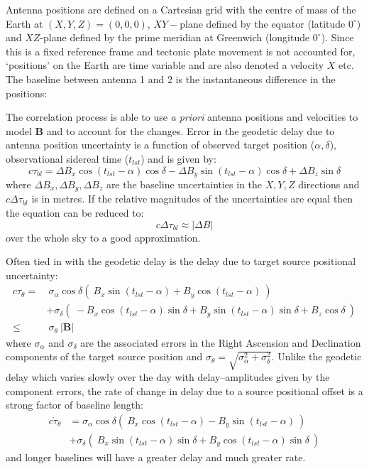 		Antenna positions are defined on a Cartesian grid with the centre of mass of the Earth at $(X,Y,Z)=(0,0,0)$, $XY-$plane defined by the equator (latitude $0^{\circ}$) and $XZ$-plane defined by the prime meridian at Greenwich (longitude $0^{\circ}$). Since this is a fixed reference frame and tectonic plate movement is not accounted for, `positions' on the Earth are time variable and are also denoted a velocity $\dot X$ etc. The baseline between antenna 1 and 2 is the instantaneous difference in the positions: %
		
		The correlation process is able to use {\it a priori} antenna positions and velocities to model $\textbf{B}$ and to account for the changes. Error in the geodetic delay due to antenna position uncertainty is a function of observed target position ($\alpha,\delta$), observational sidereal time ($t_{lst}$) and is given by:
		\begin{equation}
			c\tau_{bl} = \Delta B_x\cos(t_{lst}-\alpha)\cos\delta - \Delta B_y\sin(t_{lst}-\alpha)\cos\delta + \Delta B_z\sin\delta
			\label{eq:baselineerror}
		\end{equation} where $\Delta B_x,\Delta B_y,\Delta B_z$ are the baseline uncertainties in the $X, Y, Z$ directions and $c\Delta\tau_{bl}$ is in metres. If the relative magnitudes of the uncertainties are equal then the equation can be reduced to: $$c\Delta\tau_{bl}\approx|\Delta B|$$ over the whole sky to a good approximation.
		
		Often tied in with the geodetic delay is the delay due to target source positional uncertainty: 
		\begin{equation}
			\begin{split}
				c\tau_\theta =&~\sigma_\alpha\cos\delta\left(~B_x\sin(t_{lst}-\alpha)+B_y\cos(t_{lst}-\alpha)~\right)\\
				&+ \sigma_\delta(~-B_x\cos(t_{lst}-\alpha)\sin\delta+B_y\sin(t_{lst}-\alpha)\sin\delta+B_z\cos\delta~) \\
				 \le&~\sigma_\theta~|\textbf{B}|
			\end{split}
			\label{eq:poserror}
		\end{equation} where $\sigma_\alpha$ and $\sigma_\delta$ are the associated errors in the Right Ascension and Declination components of the target source position and $\sigma_\theta = \sqrt{\sigma_\alpha^2+\sigma_\delta^2}$. Unlike the geodetic delay which varies slowly over the day with delay--amplitudes given by the component errors, the rate of change in delay due to a source positional offset is a strong factor of baseline length:
		\begin{equation}
			\begin{split}
				c\dot{\tau}_\theta &= \sigma_\alpha\cos\delta(~B_x\cos(t_{lst}-\alpha)-B_y\sin(t_{lst}-\alpha)~)\\
				&+ \sigma_\delta(~B_x\sin(t_{lst}-\alpha)\sin\delta+B_y\cos(t_{lst}-\alpha)\sin\delta~)
			\end{split}
		\end{equation}
		and longer baselines will have a greater delay and much greater rate.
		
